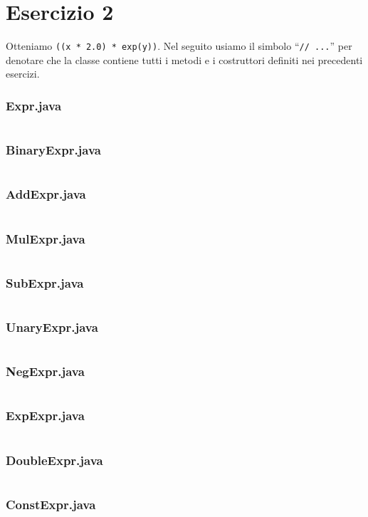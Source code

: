 \section*{Esercizio 2}

Otteniamo \texttt{((x * 2.0) * exp(y))}. Nel seguito usiamo il simbolo
``\texttt{// ...}'' per denotare che la classe contiene tutti i
metodi e i costruttori definiti nei precedenti esercizi.

\subsubsection*{Expr.java}
\inputminted{java}{tex/src/2/Expr.java}

\subsubsection*{BinaryExpr.java}
\inputminted{java}{tex/src/2/BinaryExpr.java}

\subsubsection*{AddExpr.java}
\inputminted{java}{tex/src/2/AddExpr.java}

\subsubsection*{MulExpr.java}
\inputminted{java}{tex/src/2/MulExpr.java}

\subsubsection*{SubExpr.java}
\inputminted{java}{tex/src/2/SubExpr.java}

\subsubsection*{UnaryExpr.java}
\inputminted{java}{tex/src/2/UnaryExpr.java}

\subsubsection*{NegExpr.java}
\inputminted{java}{tex/src/2/NegExpr.java}

\subsubsection*{ExpExpr.java}
\inputminted{java}{tex/src/2/ExpExpr.java}

\subsubsection*{DoubleExpr.java}
\inputminted{java}{tex/src/2/DoubleExpr.java}

\subsubsection*{ConstExpr.java}
\inputminted{java}{tex/src/2/ConstExpr.java}

